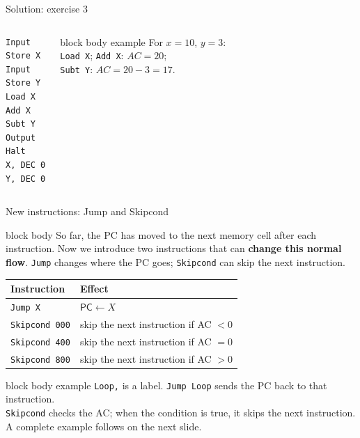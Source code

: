 \documentclass[aspectratio=169,10pt]{beamer}
\begin{document}
\begin{frame}[fragile]{Solution: exercise 3}
  \begin{columns}[T,onlytextwidth]
\begin{lstlisting}[style=marie]
Input
Store X
Input
Store Y
Load X
Add X
Subt Y
Output
Halt
X, DEC 0
Y, DEC 0
\end{lstlisting}
      \begin{beamercolorbox}[rounded=true,sep=0.12cm,wd=\linewidth]{block body example}
        \footnotesize
        For $x=10$, $y=3$:\\[0.04cm]
        \texttt{Load X}; \texttt{Add X}: $AC=20$;\\
        \texttt{Subt Y}: $AC=20-3=17$.
      \end{beamercolorbox}
  \end{columns}
\end{frame}

\begin{frame}[fragile]{New instructions: Jump and Skipcond}
  \begin{beamercolorbox}[rounded=true,sep=0.09cm,wd=\textwidth]{block body}
    \centering\footnotesize
    So far, the PC has moved to the next memory cell after each instruction.
    Now we introduce two instructions that can \textbf{change this normal flow}.
    \texttt{Jump} changes where the PC goes; \texttt{Skipcond} can skip the next instruction.
  \end{beamercolorbox}
  \vspace{0.02cm}
  \begin{center}
    \footnotesize
    \renewcommand{\arraystretch}{1.08}
    \begin{tabular}{ll}
      \toprule
      \textbf{Instruction} & \textbf{Effect} \\
      \midrule
      \texttt{Jump X}       & $\mathsf{PC}\leftarrow X$ \\
      \texttt{Skipcond 000} & skip the next instruction if AC $<0$ \\
      \texttt{Skipcond 400} & skip the next instruction if AC $=0$ \\
      \texttt{Skipcond 800} & skip the next instruction if AC $>0$ \\
      \bottomrule
    \end{tabular}
  \end{center}
  \vspace{0.08cm}
  \begin{beamercolorbox}[rounded=true,sep=0.1cm,wd=\textwidth]{block body example}
    \centering\footnotesize
    \texttt{Loop,} is a label. \texttt{Jump Loop} sends the PC back to that instruction.\\[0.04cm]
    \texttt{Skipcond} checks the AC; when the condition is true, it skips the next instruction.
    A complete example follows on the next slide.
  \end{beamercolorbox}
\end{frame}
\end{document}
